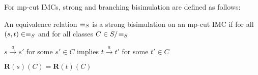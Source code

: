 For mp-cut IMCs, strong and branching bisimulation are defined as follows:

%




\begin{definition}
\label{def:strongimc}
An equivalence relation $\equiv_{S}$ is a strong bisimulation on an mp-cut IMC if for all $(s,t)\in\equiv_{S}$ and for all classes $C\in S/\!\equiv_{S}$
\begin{compactitem}
\item $s\overset{a}\rightarrow s'$ for some $s'\in C$ implies $t\overset{a}\rightarrow t'$ for some $t'\in C$
\item $\textbf{R}(s)(C)=\textbf{R}(t)(C)$
\end{compactitem}
\end{definition}

